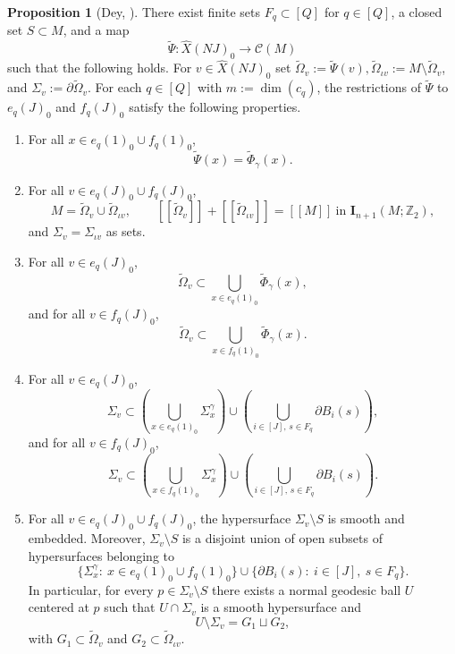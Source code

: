 \documentclass[12pt,english]{article}
\theoremstyle{definition}
\newtheorem{proposition}[theorem]{Proposition}
\begin{document}
\begin{proposition}[Dey, {\cite[Proposition~3.6]{Dey}}]
\label{prop:dey_discretization_package}
There exist finite sets $F_q\subset[Q]$ for $q\in[Q]$, a closed set $S\subset M$, and a map
\[
\widetilde\Psi:\widehat X(NJ)_0\to \mathcal C(M)
\]
such that the following holds. For $v\in\widehat X(NJ)_0$ set $\widetilde\Omega_v:=\widetilde\Psi(v), \widetilde\Omega_{\iota v}:=M\setminus \widetilde\Omega_v$, and $\Sigma_v:=\partial\widetilde\Omega_v$. For each $q\in[Q]$ with $m:=\dim(c_q)$, the restrictions of $\widetilde\Psi$ to
$e_q(J)_0$ and $f_q(J)_0$ satisfy the following properties.

\begin{enumerate}
\item[\rm(P0)$_{m,q}$]
For all $x\in e_q(1)_0\cup f_q(1)_0$,
\[
\widetilde\Psi(x)=\widetilde\Phi_\gamma(x).
\]

\item[\rm(P1)$_{m,q}$]
For all $v\in e_q(J)_0\cup f_q(J)_0$,
\[
M=\widetilde\Omega_v\cup \widetilde\Omega_{\iota v},
\qquad
[\![\widetilde\Omega_v]\!]+[\![\widetilde\Omega_{\iota v}]\!]=[\![M]\!]
\ \text{in }\mathbf I_{n+1}(M;\mathbb{Z}_2),
\]
and $\Sigma_v=\Sigma_{\iota v}$ as sets.

\item[\rm(P2)$_{m,q}$]
For all $v\in e_q(J)_0$,
\[
\widetilde\Omega_v \subset \bigcup_{x\in e_q(1)_0}\widetilde\Phi_\gamma(x),
\]
and for all $v\in f_q(J)_0$,
\[
\widetilde\Omega_v \subset \bigcup_{x\in f_q(1)_0}\widetilde\Phi_\gamma(x).
\]

\item[\rm(P3)$_{m,q}$]
For all $v\in e_q(J)_0$,
\[
\Sigma_v\subset
\left(\bigcup_{x\in e_q(1)_0}\Sigma_x^\gamma\right)
\cup
\left(\bigcup_{i\in[J],\,s\in F_q}\partial B_i(s)\right),
\]
and for all $v\in f_q(J)_0$,
\[
\Sigma_v\subset
\left(\bigcup_{x\in f_q(1)_0}\Sigma_x^\gamma\right)
\cup
\left(\bigcup_{i\in[J],\,s\in F_q}\partial B_i(s)\right).
\]

\item[\rm(P4)$_{m,q}$]
For all $v\in e_q(J)_0\cup f_q(J)_0$, the hypersurface $\Sigma_v\setminus S$ is smooth and embedded.
Moreover, $\Sigma_v\setminus S$ is a disjoint union of open subsets of hypersurfaces belonging to
\[
\{\Sigma_x^\gamma:\ x\in e_q(1)_0\cup f_q(1)_0\}\cup
\{\partial B_i(s):\ i\in[J],\ s\in F_q\}.
\]
In particular, for every $p\in \Sigma_v\setminus S$ there exists a normal geodesic ball $U$
centered at $p$ such that $U\cap \Sigma_v$ is a smooth hypersurface and
\[
U\setminus \Sigma_v=G_1\sqcup G_2,
\]
with $G_1\subset \widetilde\Omega_v$ and $G_2\subset \widetilde\Omega_{\iota v}$.


\end{enumerate}
\end{proposition}
\end{document}
